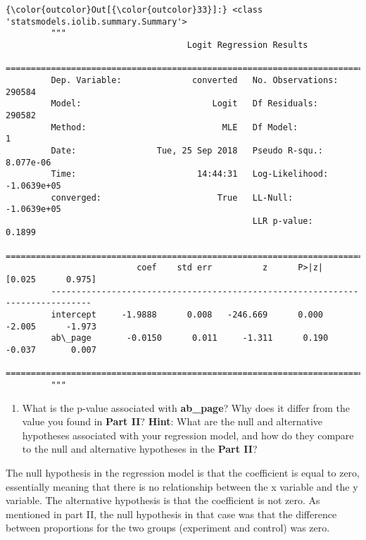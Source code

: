 \documentclass[11pt]{article}
\providecommand{\tightlist}{%
      \setlength{\itemsep}{0pt}\setlength{\parskip}{0pt}}
\begin{document}
\begin{Verbatim}[commandchars=\\\{\}]
{\color{outcolor}Out[{\color{outcolor}33}]:} <class 'statsmodels.iolib.summary.Summary'>
         """
                                    Logit Regression Results                           
         ==============================================================================
         Dep. Variable:              converted   No. Observations:               290584
         Model:                          Logit   Df Residuals:                   290582
         Method:                           MLE   Df Model:                            1
         Date:                Tue, 25 Sep 2018   Pseudo R-squ.:               8.077e-06
         Time:                        14:44:31   Log-Likelihood:            -1.0639e+05
         converged:                       True   LL-Null:                   -1.0639e+05
                                                 LLR p-value:                    0.1899
         ==============================================================================
                          coef    std err          z      P>|z|      [0.025      0.975]
         ------------------------------------------------------------------------------
         intercept     -1.9888      0.008   -246.669      0.000      -2.005      -1.973
         ab\_page       -0.0150      0.011     -1.311      0.190      -0.037       0.007
         ==============================================================================
         """
\end{Verbatim}
            
    \begin{enumerate}
\def\labelenumi{\alph{enumi}.}
\setcounter{enumi}{4}
\tightlist
\item
  What is the p-value associated with \textbf{ab\_page}? Why does it
  differ from the value you found in \textbf{Part II}? \textbf{Hint}:
  What are the null and alternative hypotheses associated with your
  regression model, and how do they compare to the null and alternative
  hypotheses in the \textbf{Part II}?
\end{enumerate}

    The null hypothesis in the regression model is that the coefficient is
equal to zero, essentially meaning that there is no relationship between
the x variable and the y variable. The alternative hypothesis is that
the coefficient is not zero. As mentioned in part II, the null
hypothesis in that case was that the difference between proportions for
the two groups (experiment and control) was zero.
\end{document}
